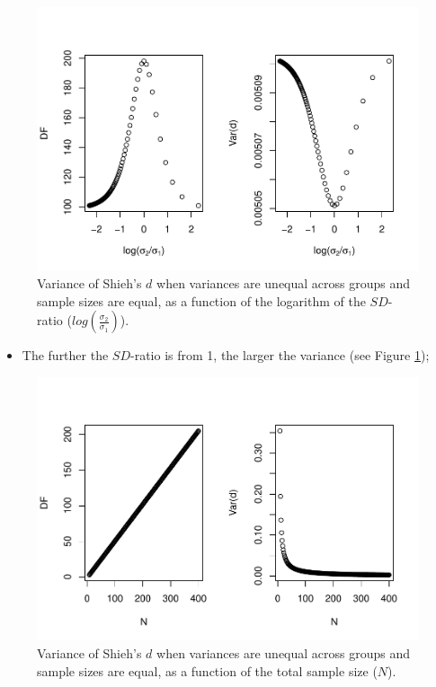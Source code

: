 \documentclass[
  english,
  man,mask]{apa6}
\providecommand{\tightlist}{%
  \setlength{\itemsep}{0pt}\setlength{\parskip}{0pt}}
\begin{document}
\begin{figure}
\centering
\includegraphics{Theoretical-Bias-of-all-estimators-as-a-function-of-population-parameters_files/figure-latex/varshiehhetbalSDratio2-1.pdf}
\caption{\label{fig:varshiehhetbalSDratio2}Variance of Shieh's \(d\) when variances are unequal across groups and sample sizes are equal, as a function of the logarithm of the \(SD\)-ratio (\(log \left( \frac{\sigma_2}{\sigma_1} \right)\)).}
\end{figure}

\begin{itemize}
\tightlist
\item
  The further the \(SD\)-ratio is from 1, the larger the variance (see Figure \ref{fig:varshiehhetbalSDratio2});
\end{itemize}

\begin{figure}
\centering
\includegraphics{Theoretical-Bias-of-all-estimators-as-a-function-of-population-parameters_files/figure-latex/varshiehhetbalNsize2-1.pdf}
\caption{\label{fig:varshiehhetbalNsize2}Variance of Shieh's \(d\) when variances are unequal across groups and sample sizes are equal, as a function of the total sample size (\(N\)).}
\end{figure}
\end{document}
